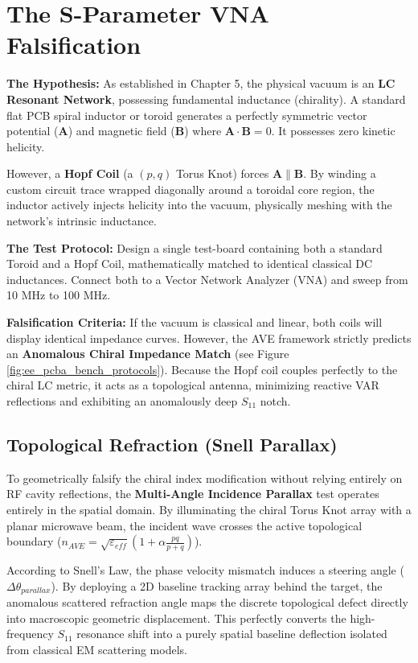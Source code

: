 \section{The S-Parameter VNA Falsification}
\textbf{The Hypothesis:} As established in Chapter 5, the physical vacuum is an \textbf{LC Resonant Network}, possessing fundamental inductance (chirality). A standard flat PCB spiral inductor or toroid generates a perfectly symmetric vector potential ($\mathbf{A}$) and magnetic field ($\mathbf{B}$) where $\mathbf{A} \cdot \mathbf{B} = 0$. It possesses zero kinetic helicity.

However, a \textbf{Hopf Coil} (a $(p,q)$ Torus Knot) forces $\mathbf{A} \parallel \mathbf{B}$. By winding a custom circuit trace wrapped diagonally around a toroidal core region, the inductor actively injects helicity into the vacuum, physically meshing with the network's intrinsic inductance.

\textbf{The Test Protocol:} Design a single test-board containing both a standard Toroid and a Hopf Coil, mathematically matched to identical classical DC inductances. Connect both to a Vector Network Analyzer (VNA) and sweep from 10 MHz to 100 MHz.

\textbf{Falsification Criteria:} If the vacuum is classical and linear, both coils will display identical impedance curves. However, the AVE framework strictly predicts an \textbf{Anomalous Chiral Impedance Match} (see Figure \ref{fig:ee_pcba_bench_protocols}). Because the Hopf coil couples perfectly to the chiral LC metric, it acts as a topological antenna, minimizing reactive VAR reflections and exhibiting an anomalously deep $S_{11}$ notch.

\subsection{Topological Refraction (Snell Parallax)}
To geometrically falsify the chiral index modification without relying entirely on RF cavity reflections, the \textbf{Multi-Angle Incidence Parallax} test operates entirely in the spatial domain. By illuminating the chiral Torus Knot array with a planar microwave beam, the incident wave crosses the active topological boundary ($n_{AVE} = \sqrt{\varepsilon_{eff}}(1 + \alpha \frac{pq}{p+q})$). 

According to Snell's Law, the phase velocity mismatch induces a steering angle ($\Delta \theta_{parallax}$). By deploying a 2D baseline tracking array behind the target, the anomalous scattered refraction angle maps the discrete topological defect directly into macroscopic geometric displacement. This perfectly converts the high-frequency $S_{11}$ resonance shift into a purely spatial baseline deflection isolated from classical EM scattering models.

